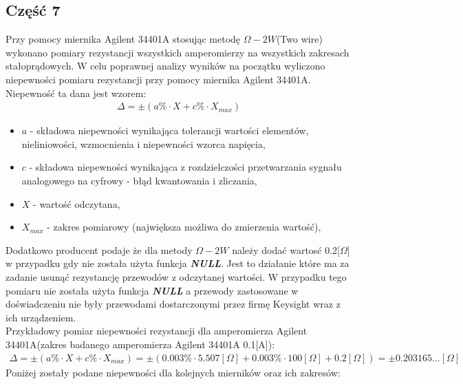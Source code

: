 \documentclass[11pt]{article}
\begin{document}
    \subsection*{Część 7}
    Przy pomocy miernika Agilent 34401A stosując metodę $\Omega-2W$(Two wire)
    wykonano pomiary rezystancji wszystkich amperomierzy na wszystkich zakresach stałoprądowych.
    W celu poprawnej analizy wyników na początku wyliczono niepewności pomiaru rezystancji przy pomocy miernika Agilent 34401A.
    Niepewność ta dana jest wzorem:
    \begin{gather*}
        \Delta=\pm(a\%\cdot X+c\%\cdot X_{max})
    \end{gather*}
    {\footnotesize
        \begin{itemize}
            \setlength\itemsep{0em}
            \item[] \boldmath$a$ - składowa niepewności wynikająca tolerancji wartości elementów, nieliniowości, wzmocnienia i niepewności wzorca napięcia,
            \item[] \boldmath$c$ - składowa niepewności wynikająca z rozdzielczości przetwarzania sygnału analogowego na cyfrowy - błąd kwantowania i zliczania,
            \item[] \boldmath$X$ - wartość odczytana,
            \item[] \boldmath$X_{max}$ - zakres pomiarowy (największa możliwa do zmierzenia wartość),
        \end{itemize}}
    Dodatkowo producent podaje że dla metody $\Omega-2W$ należy dodać wartosć 0.2[$\Omega$] w
    przypadku gdy nie została użyta funkcja \textbf\textit{NULL}. Jest to działanie
    które ma za zadanie usunąć rezystancję przewodów z odczytanej wartości. W przypadku
    tego pomiaru nie została użyta funkcja \textbf\textit{NULL} a przewody zastosowane w
    doświadczeniu nie były przewodami dostarczonymi przez firmę Keysight wraz z ich urządzeniem.\\
    Przykładowy pomiar niepewności rezystancji dla amperomierza Agilent 34401A(zakres badanego amperomierza Agilent 34401A 0.1[A]):
    \begin{gather*}
        \Delta=\pm(a\%\cdot X+c\%\cdot X_{max})=\pm(0.003\%\cdot 5.507[\Omega]+0.003\%\cdot 100[\Omega]+0.2[\Omega])=\pm 0.203165\dots[\Omega]
    \end{gather*}
    \noindent Poniżej zostały podane niepewności dla kolejnych mierników oraz ich zakresów:
    \begin{center}
    \end{center}\vspace{3mm}
\end{document}
